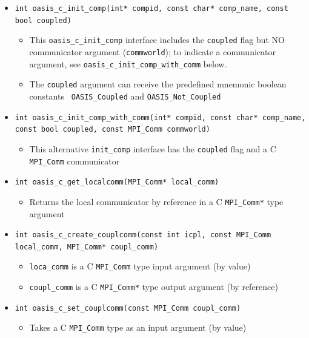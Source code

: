 \vspace{0.2cm}
\begin{itemize}

\item {\tt int oasis\_c\_init\_comp(int* compid, const char* comp\_name, const bool coupled)}
  \begin{itemize}
  \item This {\tt oasis\_c\_init\_comp} interface includes the {\tt coupled} flag but
    NO communicator argument ({\tt commworld}); to indicate a
    communicator argument, see {\tt oasis\_c\_init\_comp\_with\_comm} below.
    \item The {\tt coupled} argument can receive the predefined mnemonic boolean constants {\tt
      OASIS\_Coupled} and {\tt OASIS\_Not\_Coupled}
  \end{itemize}

\vspace{0.2cm}
\item {\tt int oasis\_c\_init\_comp\_with\_comm(int* compid, const char* comp\_name, const bool coupled, const MPI\_Comm commworld)}
  \begin{itemize}
  \item This alternative {\tt init\_comp} interface has the {\tt coupled} flag and a C {\tt MPI\_Comm} communicator
  \end{itemize}

\vspace{0.2cm}
\item {\tt int oasis\_c\_get\_localcomm(MPI\_Comm* local\_comm)}
  \begin{itemize}
  \item Returns the local communicator by reference in a C {\tt MPI\_Comm*} type argument
  \end{itemize}

\vspace{0.2cm}
\item {\tt int oasis\_c\_create\_couplcomm(const int icpl, const MPI\_Comm local\_comm, MPI\_Comm* coupl\_comm)}
  \begin{itemize}
  \item {\tt loca\_comm} is a C {\tt MPI\_Comm} type input argument (by value)
  \item {\tt coupl\_comm} is a C {\tt MPI\_Comm*} type output argument (by reference)
  \end{itemize}

\vspace{0.2cm}
\item {\tt int oasis\_c\_set\_couplcomm(const MPI\_Comm coupl\_comm)}
  \begin{itemize}
  \item Takes a C {\tt MPI\_Comm} type as an input argument (by value)
  \end{itemize}


\end{itemize}
